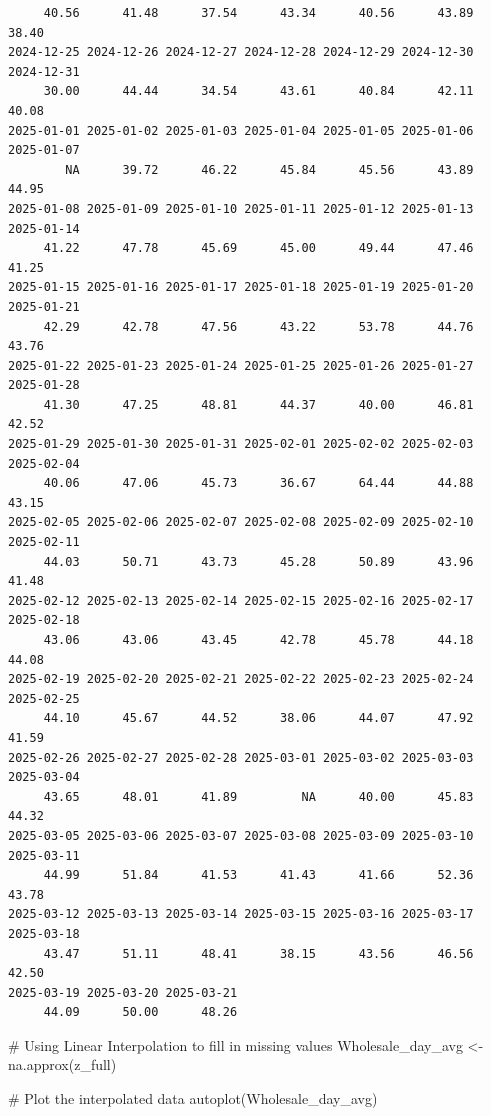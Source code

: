 \documentclass[
  letterpaper,
  DIV=11,
  numbers=noendperiod]{scrartcl}
\newenvironment{Shaded}{\begin{snugshade}}{\end{snugshade}}
\newcommand{\CommentTok}[1]{\textcolor[rgb]{0.37,0.37,0.37}{#1}}
\newcommand{\FunctionTok}[1]{\textcolor[rgb]{0.28,0.35,0.67}{#1}}
\newcommand{\NormalTok}[1]{\textcolor[rgb]{0.00,0.23,0.31}{#1}}
\newcommand{\OtherTok}[1]{\textcolor[rgb]{0.00,0.23,0.31}{#1}}
\begin{document}
\begin{verbatim}
     40.56      41.48      37.54      43.34      40.56      43.89      38.40 
2024-12-25 2024-12-26 2024-12-27 2024-12-28 2024-12-29 2024-12-30 2024-12-31 
     30.00      44.44      34.54      43.61      40.84      42.11      40.08 
2025-01-01 2025-01-02 2025-01-03 2025-01-04 2025-01-05 2025-01-06 2025-01-07 
        NA      39.72      46.22      45.84      45.56      43.89      44.95 
2025-01-08 2025-01-09 2025-01-10 2025-01-11 2025-01-12 2025-01-13 2025-01-14 
     41.22      47.78      45.69      45.00      49.44      47.46      41.25 
2025-01-15 2025-01-16 2025-01-17 2025-01-18 2025-01-19 2025-01-20 2025-01-21 
     42.29      42.78      47.56      43.22      53.78      44.76      43.76 
2025-01-22 2025-01-23 2025-01-24 2025-01-25 2025-01-26 2025-01-27 2025-01-28 
     41.30      47.25      48.81      44.37      40.00      46.81      42.52 
2025-01-29 2025-01-30 2025-01-31 2025-02-01 2025-02-02 2025-02-03 2025-02-04 
     40.06      47.06      45.73      36.67      64.44      44.88      43.15 
2025-02-05 2025-02-06 2025-02-07 2025-02-08 2025-02-09 2025-02-10 2025-02-11 
     44.03      50.71      43.73      45.28      50.89      43.96      41.48 
2025-02-12 2025-02-13 2025-02-14 2025-02-15 2025-02-16 2025-02-17 2025-02-18 
     43.06      43.06      43.45      42.78      45.78      44.18      44.08 
2025-02-19 2025-02-20 2025-02-21 2025-02-22 2025-02-23 2025-02-24 2025-02-25 
     44.10      45.67      44.52      38.06      44.07      47.92      41.59 
2025-02-26 2025-02-27 2025-02-28 2025-03-01 2025-03-02 2025-03-03 2025-03-04 
     43.65      48.01      41.89         NA      40.00      45.83      44.32 
2025-03-05 2025-03-06 2025-03-07 2025-03-08 2025-03-09 2025-03-10 2025-03-11 
     44.99      51.84      41.53      41.43      41.66      52.36      43.78 
2025-03-12 2025-03-13 2025-03-14 2025-03-15 2025-03-16 2025-03-17 2025-03-18 
     43.47      51.11      48.41      38.15      43.56      46.56      42.50 
2025-03-19 2025-03-20 2025-03-21 
     44.09      50.00      48.26 
\end{verbatim}

\begin{Shaded}
\begin{Highlighting}[]
\CommentTok{\# Using Linear Interpolation to fill in missing values}
\NormalTok{Wholesale\_day\_avg }\OtherTok{\textless{}{-}} \FunctionTok{na.approx}\NormalTok{(z\_full)}

\CommentTok{\# Plot the interpolated data}
\FunctionTok{autoplot}\NormalTok{(Wholesale\_day\_avg)}
\end{Highlighting}
\end{Shaded}
\end{document}
